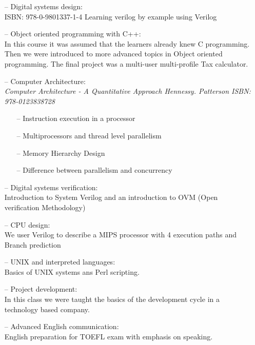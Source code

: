 \documentclass{article}
\begin{document}
    \begin{itemize}
     \setlength\itemsep{0pt}
        \item[--] Digital systems design:\\
            ISBN: 978-0-9801337-1-4
            Learning verilog by example using Verilog
        \item[--] Object oriented programming with C++:\\
            In this course it was assumed that the learners already knew C programming.
            Then we were introduced to more advanced topics in Object oriented programming.
            The final project was a multi-user multi-profile Tax calculator.
        \item[--] Computer Architecture:\\
           \emph{Computer Architecture - A Quantitative Approach
            Hennessy. Patterson ISBN: 978-0123838728 }
            \begin{itemize}

            \item[--]Instruction execution in a processor

            \item[--] Multiprocessors and thread level parallelism
           \item[--] Memory Hierarchy Design
           \item[--] Difference between parallelism and concurrency
           \end{itemize}

        \item[--] Digital systems verification:\\
            Introduction to System Verilog and an introduction to OVM (Open verification Methodology)
        \item[--] CPU design:\\
            We user Verilog to describe a MIPS processor with 4 execution paths and Branch prediction
        \item[--] UNIX and interpreted languages:\\
            Basics of UNIX systems ans Perl scripting.
        \item[--] Project development:\\
            In this class we were taught the basics of the development cycle in a technology based company.
        \item[--] Advanced English communication:\\
            English preparation for TOEFL exam with emphasis on speaking.
    \end{itemize}
\end{document}
